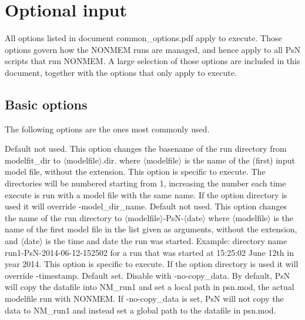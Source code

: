\section{Optional input}
All options listed in document common\_options.pdf apply to 
execute. 
Those options govern how the NONMEM runs are managed, 
and hence apply to all PsN scripts that run NONMEM. 
A large selection of those options are included in this document,
together with the options that only apply to execute.

\renewcommand{\guidetoolname}{modelfit}
\subsection{Basic options}
The following options are the ones most commonly used.

\renewcommand{\guidetoolname}{execute}

\begin{optionlist}
Default not used. 
This option changes the basename of the run directory from modelfit\_dir 
to $\langle$modelfile$\rangle$.dir. where $\langle$modelfile$\rangle$ 
is the name of the (first) input model file, without the extension. 
This option is specific to execute.
The directories will be numbered starting from 1, increasing the number each time execute is run with a model file with the 
same name. If the option directory is used it will override -model\_dir\_name.
\nextopt
{}
Default not used. This option changes the name of the run directory to $\langle$modelfile$\rangle$-PsN-$\langle$date$\rangle$
where $\langle$modelfile$\rangle$ is the name of the first model file in the list given as arguments, without the extension,
and $\langle$date$\rangle$ is the time and date the run was started. 
Example: directory name run1-PsN-2014-06-12-152502 for a run that was started at 15:25:02 June 12th in year 2014.
This option is specific to execute.
If the option directory is used it will override -timestamp.
\nextopt
{}
Default set. Disable with -no-copy\_data. By default, PsN will copy the datafile into NM\_run1 and set a local path in psn.mod, the actual modelfile run with NONMEM. If -no-copy\_data is set, PsN will not copy the data to NM\_run1 and instead set a global path to the datafile in psn.mod.
\nextopt
\end{optionlist}

